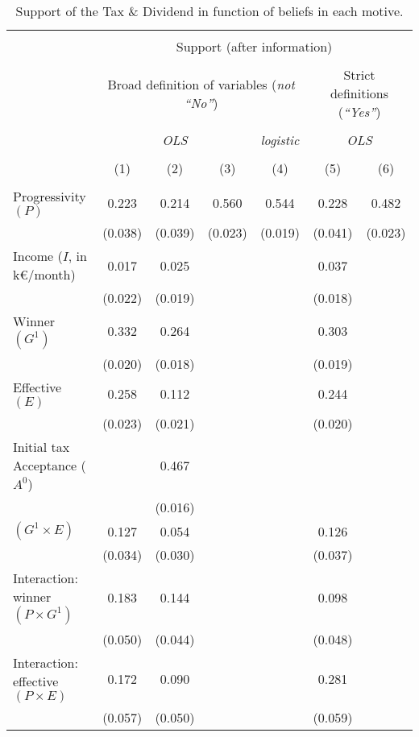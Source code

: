 
\begin{table}[!htbp] \centering 
  \caption{Support of the Tax \& Dividend in function of beliefs in each motive.} 
  \label{tab:progressivity} 
\begin{tabular}{@{\extracolsep{5pt}}lcccccc} 
\\[-1.8ex]\hline 
\hline \\[-1.8ex] 
 & \multicolumn{6}{c}{Support (after information)} \\ 
\cline{2-7} 
\\[-1.8ex] & \multicolumn{4}{c}{Broad definition of variables (\textit{not ``No''})} & \multicolumn{2}{c}{Strict definitions (\textit{``Yes''})} \\ 
\\[-1.8ex] & \multicolumn{3}{c}{\textit{OLS}} & \textit{logistic} & \multicolumn{2}{c}{\textit{OLS}} \\ 
\\[-1.8ex] & (1) & (2) & (3) & (4) & (5) & (6)\\ 
\hline \\[-1.8ex] 
 Progressivity $(P)$ & 0.223 & 0.214 & 0.560 & 0.544 & 0.228 & 0.482 \\ 
  & (0.038) & (0.039) & (0.023) & (0.019) & (0.041) & (0.023) \\ 
  Income ($I$, in k\euro{}/month) & 0.017 & 0.025 &  &  & 0.037 &  \\ 
  & (0.022) & (0.019) &  &  & (0.018) &  \\ 
  Winner $(G^1)$ & 0.332 & 0.264 &  &  & 0.303 &  \\ 
  & (0.020) & (0.018) &  &  & (0.019) &  \\ 
  Effective $(E)$ & 0.258 & 0.112 &  &  & 0.244 &  \\ 
  & (0.023) & (0.021) &  &  & (0.020) &  \\ 
  Initial tax Acceptance ($A^0$) &  & 0.467 &  &  &  &  \\ 
  &  & (0.016) &  &  &  &  \\ 
  $(G^1 \times E)$ & 0.127 & 0.054 &  &  & 0.126 &  \\ 
  & (0.034) & (0.030) &  &  & (0.037) &  \\ 
  Interaction: winner $(P \times G^1)$ & 0.183 & 0.144 &  &  & 0.098 &  \\ 
  & (0.050) & (0.044) &  &  & (0.048) &  \\ 
  Interaction: effective $(P \times E)$ & 0.172 & 0.090 &  &  & 0.281 &  \\ 
  & (0.057) & (0.050) &  &  & (0.059) &  \\ 

\end{tabular}
\end{table}

